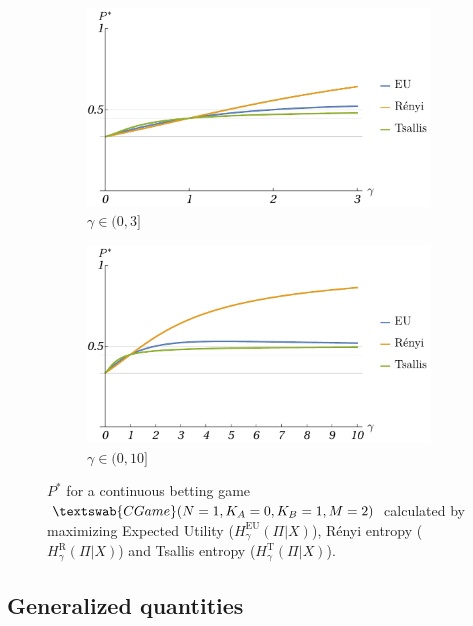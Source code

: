 \documentclass{article}
\theoremstyle{definition}
\newcommand{\CG}[1]{$\textswab{CGame}(#1)$}
\begin{document}
\begin{figure}[H]
    \centering
    \begin{subfigure}[b]{0.45\textwidth}
        \includegraphics[width=\textwidth]{img/EURT_1012_03.pdf}
        \caption{$\gamma \in (0,3]$}
        \label{fig:EURT_03}
    \end{subfigure}
    \hspace{0.01\textwidth} %
    \begin{subfigure}[b]{0.45\textwidth}
        \includegraphics[width=\textwidth]{img/EURT_1012_010.pdf}
        \caption{$\gamma \in (0,10]$}
        \label{fig:EURT_010}
    \end{subfigure}
    
    \caption{$P^*$ for a continuous betting game \CG{N=1,K_A=0,K_B=1,M=2} calculated by maximizing Expected Utility ($H^\text{EU}_\gamma(\Pi|X)$), Rényi entropy ($H^\text{R}_\gamma(\Pi|X)$) and Tsallis entropy ($H^\text{T}_\gamma(\Pi|X)$).}
    \label{fig:EURT_shy}
\end{figure}

\subsection{Generalized quantities}
\end{document}
